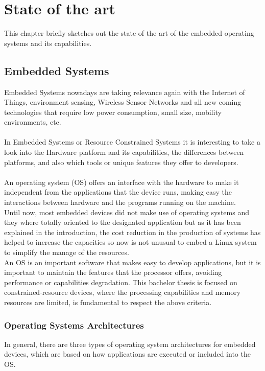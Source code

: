 \chapter{State of the art}\label{C:State-Art}
This chapter briefly sketches out the state of the art of the embedded operating systems and its capabilities.

\section{Embedded Systems}\label{S:SOTA-Embedded-Systems}
Embedded Systems nowadays are taking relevance again with the Internet of Things, environment sensing, Wireless Sensor Networks and all new coming technologies that require low power consumption, small size, mobility environments, etc.
\\
\\
In Embedded Systems or Resource Constrained Systems it is interesting to take a look into the Hardware platform and its capabilities, the differences between platforms, and also which tools or unique features they offer to developers.
\\
\\
An operating system (OS) offers an interface with the hardware to make it independent from the applications that the device runs, making easy the interactions between hardware and the programs running on the machine.
\\
Until now, most embedded devices did not make use of operating systems and they where totally oriented to the designated application but as it has been explained in the introduction, the cost reduction in the production of systems has helped to increase the capacities so now is not unusual to embed a Linux system to simplify the manage of the resources.
\\
An OS is an important software that makes easy to develop applications, but it is important to maintain the features that the processor offers, avoiding performance or capabilities degradation. 
This bachelor thesis is focused on constrained-resource devices, where the processing capabilities and memory resources are limited, is fundamental to respect the above criteria.

\subsection{Operating Systems Architectures}\label{SOTA-Operating-Systems-Architectures}
In general, there are three types of operating system architectures for embedded devices, which are based on how applications are executed or included into the OS.

